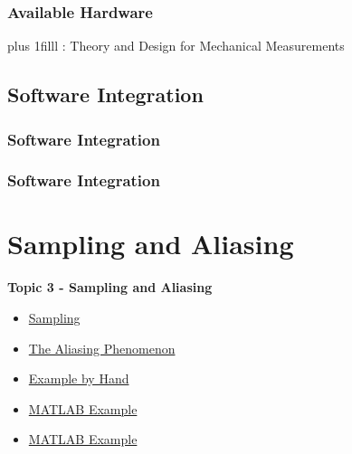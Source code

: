 \documentclass[fleqn]{beamer} %
\newcommand{\sectionIIItitle}{Sampling and Aliasing}
\newcommand{\sectionIIsubsectionIIItitle}{Available Hardware}
\newcommand{\sectionIIsubsectionIVtitle}{Software Integration}
\newcommand{\sectionIIIsubsectionItitle}{Sampling}
\newcommand{\sectionIIIsubsectionIItitle}{The Aliasing Phenomenon}
\newcommand{\sectionIIIsubsectionIIItitle}{Example by Hand}
\newcommand{\sectionIIIsubsectionIVtitle}{MATLAB Example}
\newcommand{\btVFill}{\vskip0pt plus 1filll}
\begin{document}
			\begin{frame}
			\frametitle{\sectionIIsubsectionIIItitle}




				\btVFill
				\tiny{ : Theory and Design for Mechanical Measurements}	

			\end{frame}

		\subsection{\sectionIIsubsectionIVtitle}\label{sectionIIsubsectionIV}

			\begin{frame}
				\frametitle{\sectionIIsubsectionIVtitle}


			\end{frame}

			\begin{frame}
				\frametitle{\sectionIIsubsectionIVtitle}


			\end{frame}
		
	\section{\sectionIIItitle}\label{sectionIII}

		\begin{frame}
			\large \textbf{Topic 3 - \sectionIIItitle} \vspace{3mm}\\

			\begin{itemize}
				\item \hyperlink{sectionIIIsubsectionI}{\sectionIIIsubsectionItitle} \vspc %
				\item \hyperlink{sectionIIIsubsectionII}{\sectionIIIsubsectionIItitle} \vspc %
				\item \hyperlink{sectionIIIsubsectionIII}{\sectionIIIsubsectionIIItitle} \vspc %
				\item \hyperlink{sectionIIIsubsectionIV}{\sectionIIIsubsectionIVtitle} \vspc %
				\item \hyperlink{sectionIIIsubsectionV}{\sectionIIIsubsectionIVtitle} \vspc %
			\end{itemize}

		\end{frame}
\end{document}
